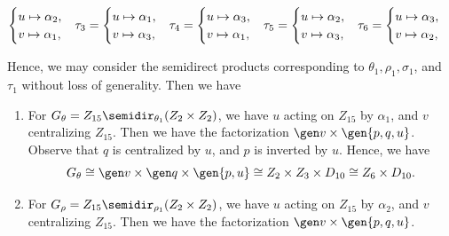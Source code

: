\begin{solenum}
\begin{itemize}
\begin{itemize}
\[\begin{cases}
                    u \mapsto \alpha_2, \\
                    v \mapsto \alpha_1,
                \end{cases} \hspace{-2pt}
                \tau_3 =
                \begin{cases}
                    u \mapsto \alpha_1, \\
                    v \mapsto \alpha_3,
                \end{cases} \hspace{-2pt}
                \tau_4 =
                \begin{cases}
                    u \mapsto \alpha_3, \\
                    v \mapsto \alpha_1,
                \end{cases} \hspace{-2pt}
                \tau_5 = 
                \begin{cases}
                    u \mapsto \alpha_2, \\
                    v \mapsto \alpha_3,
                \end{cases} \hspace{-2pt}
                \tau_6 =
                \begin{cases}
                    u \mapsto \alpha_3, \\
                    v \mapsto \alpha_2,
                \end{cases}
	        \]
        \end{itemize}
        Hence, we may consider the semidirect products corresponding to $\theta_1, \rho_1, \sigma_1$, and $\tau_1$ without loss of generality.
	Then we have
        \begin{enumerate}
            \item For $G_\theta = Z_{15} \semidir_{\theta_1} (Z_2 \times Z_2)$, we have $u$ acting on $Z_{15}$ by $\alpha_1$, and $v$ centralizing $Z_{15}$.
	Then we have the factorization $\gen v \times \gen{p, q, u}$.
	Observe that $q$ is centralized by $u$, and $p$ is inverted by $u$.
	Hence, we have
            \[
            	G_\theta \cong \gen v \times \gen q \times \gen{p, u} \cong Z_2 \times Z_3 \times D_{10} \cong Z_6 \times D_{10}.
            \]
            \item For $G_\rho = Z_{15} \semidir_{\rho_1} (Z_2 \times Z_2)$, we have $u$ acting on $Z_{15}$ by $\alpha_2$, and $v$ centralizing $Z_{15}$.
	Then we have the factorization $\gen v \times \gen{p, q, u}$.

\end{enumerate}
\end{itemize}
\end{solenum}
